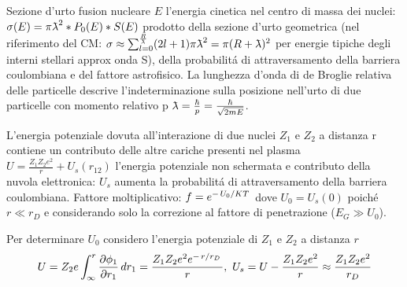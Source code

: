 \begin{frame}{Sezione d'urto fusion nucleare}
$E$ l'energia cinetica nel centro di massa dei nuclei: $\sigma(E)=\pi\lambdabar^2*P_0(E)*S(E)$
prodotto della sezione d'urto geometrica (nel riferimento del CM: $\sigma\approx\sum_{l=0}^{\frac{R}{\lambdabar}}(2l+1)\pi\lambdabar^2=\pi(R+\lambdabar)^2$
per energie tipiche degli interni stellari approx onda S), della probabilit\'a di attraversamento della barriera coulombiana e del fattore astrofisico. La lunghezza d'onda di de Broglie relativa delle particelle descrive l'indeterminazione sulla posizione nell'urto di due particelle con momento relativo p $\lambdabar=\frac{\hbar}{p}=\frac{\hbar}{\sqrt{2mE}}$.

L'energia potenziale dovuta all'interazione di due nuclei $Z_1$ e $Z_2$ a distanza r contiene un contributo delle altre cariche presenti nel plasma $U=\frac{Z_1Z_2e^2}{r}+U_s(r_{12})$
l'energia potenziale non schermata e contributo della nuvola elettronica: $U_s$ aumenta la probabilit\'a di attraversamento della barriera coulombiana. Fattore moltiplicativo: $f=e^{-\left.{U_0}\middle/{KT}\right.}$ dove $U_0=U_s(0)$ poich\'e $r\ll r_D$ e considerando solo la correzione al fattore di penetrazione ($E_G\gg U_0$).

Per determinare $U_0$ considero l'energia potenziale di $Z_1$ e $Z_2$ a distanza $r$
\begin{equation*}
U=Z_2e\int_{\infty}^r\PDy{r_1}{\phi_1}\,dr_1=\frac{Z_1Z_2e^2\exp{-\midfrac{r}{r_D}}}{r},\ U_s=U-\frac{Z_1Z_2e^2}{r}\approx\frac{Z_1Z_2e^2}{r_D}
\end{equation*}
\end{frame}

